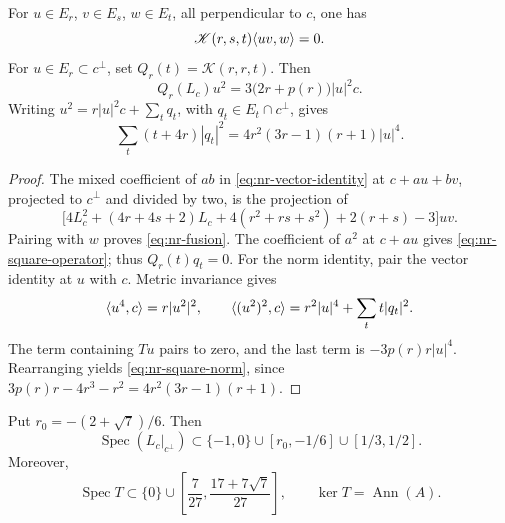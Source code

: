 \begin{lemma}\label{lem:nr-fusion-square}
For \(u\in E_r\), \(v\in E_s\), \(w\in E_t\), all
perpendicular to \(c\), one has
\begin{equation}\label{eq:nr-fusion}
 \mathscr K(r,s,t)\langle uv,w\rangle=0.
\end{equation}
For \(u\in E_r\subset c^\perp\), set
\(Q_r(t)=\mathscr K(r,r,t)\). Then
\begin{equation}\label{eq:nr-square-operator}
 Q_r(L_c)u^2=3\bigl(2r+p(r)\bigr)|u|^2c.
\end{equation}
Writing \(u^2=r|u|^2c+\sum_tq_t\), with
\(q_t\in E_t\cap c^\perp\), gives
\begin{equation}\label{eq:nr-square-norm}
 \sum_t(t+4r)|q_t|^2=4r^2(3r-1)(r+1)|u|^4.
\end{equation}
\end{lemma}

\begin{proof}
The mixed coefficient of \(ab\) in
\eqref{eq:nr-vector-identity} at \(c+au+bv\), projected to
\(c^\perp\) and divided by two, is the projection of
\[
 \bigl[4L_c^2+(4r+4s+2)L_c
       +4(r^2+rs+s^2)+2(r+s)-3\bigr]uv.
\]
Pairing with \(w\) proves \eqref{eq:nr-fusion}. The coefficient
of \(a^2\) at \(c+au\) gives
\eqref{eq:nr-square-operator}; thus \(Q_r(t)q_t=0\).
For the norm identity, pair the vector identity at \(u\) with \(c\).
Metric invariance gives
\[
 \langle u^4,c\rangle=r|u^2|^2,\qquad
 \langle (u^2)^2,c\rangle=r^2|u|^4+\sum_t t|q_t|^2.
\]
The term containing \(Tu\) pairs to zero, and the last term is
\(-3p(r)r|u|^4\). Rearranging yields
\eqref{eq:nr-square-norm}, since
\(3p(r)r-4r^3-r^2=4r^2(3r-1)(r+1)\).
\end{proof}

\begin{proposition}
\label{prop:nr-spectral-interval}
Put \(r_0=-(2+\sqrt7)/6\). Then
\begin{equation}\label{eq:nr-Peirce-interval}
 \operatorname{Spec}(L_c|_{c^\perp})
 \subset\{-1,0\}\cup[r_0,-1/6]\cup[1/3,1/2].
\end{equation}
Moreover,
\begin{equation}\label{eq:nr-quotient-interval}
 \operatorname{Spec}T\subset\{0\}\cup
 \left[\frac7{27},\frac{17+7\sqrt7}{27}\right],
 \qquad \ker T=\operatorname{Ann}(A).
\end{equation}
\end{proposition}


